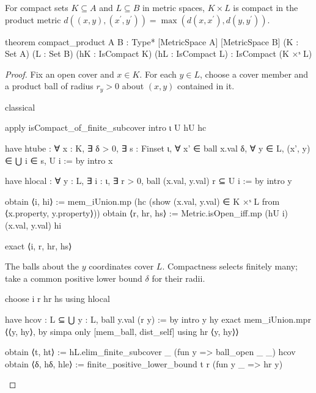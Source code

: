 \begin{lemma}
  \label{an1:lem:compact-product}
  For compact sets $K\subseteq A$ and $L\subseteq B$ in metric spaces, $K\times L$ is compact in
  the product metric $d((x,y),(x^{\prime},y^{\prime}))=\max(d(x,x^{\prime}),d(y,y^{\prime}))$.

  \begin{lean}
    theorem compact_product {A B : Type*} [MetricSpace A] [MetricSpace B]
        (K : Set A) (L : Set B) (hK : IsCompact K) (hL : IsCompact L) :
        IsCompact (K ×ˢ L)
  \end{lean}
\end{lemma}

\begin{proof}
  Fix an open cover and $x\in K$.
  For each $y\in L$, choose a cover member and a product ball of radius $r_y>0$ about $(x,y)$
  contained in it.

  \begin{lean}
    classical

    apply isCompact_of_finite_subcover
    intro ι U hU hc

    have htube : ∀ x : K, ∃ δ > 0, ∃ s : Finset ι,
        ∀ x' ∈ ball x.val δ, ∀ y ∈ L, (x', y) ∈ ⋃ i ∈ s, U i := by
      intro x

      have hlocal : ∀ y : L, ∃ i : ι, ∃ r > 0, ball (x.val, y.val) r ⊆ U i := by
        intro y

        obtain ⟨i, hi⟩ := mem_iUnion.mp
          (hc (show (x.val, y.val) ∈ K ×ˢ L from ⟨x.property, y.property⟩))
        obtain ⟨r, hr, hs⟩ := Metric.isOpen_iff.mp (hU i) (x.val, y.val) hi

        exact ⟨i, r, hr, hs⟩
  \end{lean}

  The balls about the $y$ coordinates cover $L$.
  Compactness selects finitely many; take a common positive lower bound $\delta$ for their radii.

  \begin{lean}
    choose i r hr hs using hlocal

    have hcov : L ⊆ ⋃ y : L, ball y.val (r y) := by
      intro y hy
      exact mem_iUnion.mpr ⟨⟨y, hy⟩, by simpa only [mem_ball, dist_self] using hr ⟨y, hy⟩⟩

    obtain ⟨t, ht⟩ := hL.elim_finite_subcover _ (fun y => ball_open _ _) hcov
    obtain ⟨δ, hδ, hle⟩ := finite_positive_lower_bound t r (fun y _ => hr y)
  \end{lean}


\end{proof}
